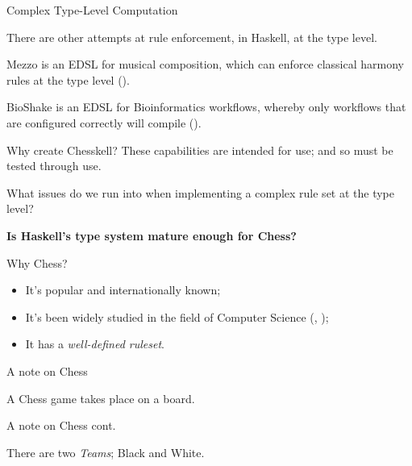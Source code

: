 \documentclass{beamer}
\begin{document}
\begin{frame}{Complex Type-Level Computation}

There are other attempts at rule enforcement, in Haskell, at the type level.

\pause

Mezzo is an EDSL for musical composition, which can enforce classical harmony rules at the type level (\cite{mezzohaskellsymposium}).

\pause

BioShake is an EDSL for Bioinformatics workflows, whereby only workflows that are configured correctly will compile (\cite{bioshake}).
    
\end{frame}

\begin{frame}[fragile]{Why create Chesskell?}
These capabilities are intended for use; and so must be tested through use.

What issues do we run into when implementing a complex rule set at the type level?

\pause

\textbf{Is Haskell's type system mature enough for Chess?}

\end{frame}

\begin{frame}{Why Chess?}

\begin{itemize}
    \item<1-3> It's popular and internationally known;
    \item<2-3> It's been widely studied in the field of Computer Science (\cite{chesseducation}, \cite{chessml});
    \item<3-4> It has a \emph{well-defined ruleset}.
\end{itemize}
    
\end{frame}

\begin{frame}{A note on Chess}

A Chess game takes place on a board.

\begin{figure}[h]
    \centering
    \showboard
    \label{emptyboard}
\end{figure}

\end{frame}

\begin{frame}{A note on Chess cont.}

There are two \emph{Teams}; Black and White.

\begin{figure}[h]
    \centering
    \newgame
    \showboard
    \label{startboard1}
\end{figure}

\end{frame}
\end{document}
